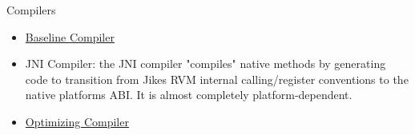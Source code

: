 \begin{section}{Compilers}
\label{sec:compilers}

\begin{itemize}
  \item \hyperref[sec:baselinecompiler]{Baseline Compiler}
  \item JNI Compiler: the JNI compiler "compiles" native methods by generating code to transition from Jikes RVM internal calling/register conventions to the native platforms ABI. It is almost completely platform-dependent.
  \item \hyperref[sec:optimizingcompiler]{Optimizing Compiler}
\end{itemize}

\end{section}
